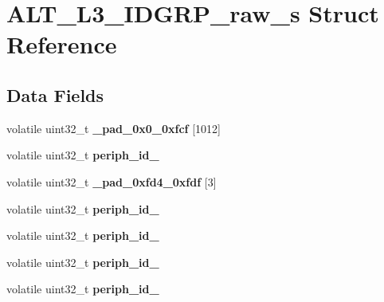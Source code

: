\hypertarget{structALT__L3__IDGRP__raw__s}{}\section{A\+L\+T\+\_\+\+L3\+\_\+\+I\+D\+G\+R\+P\+\_\+raw\+\_\+s Struct Reference}
\label{structALT__L3__IDGRP__raw__s}
\subsection*{Data Fields}
\begin{DoxyCompactItemize}
\item 
\mbox{\label{structALT__L3__IDGRP__raw__s_aa74bcd1eb681706f32f52cc8cdf855bd}} 
volatile uint32\+\_\+t {\bfseries \+\_\+pad\+\_\+0x0\+\_\+0xfcf} \mbox{[}1012\mbox{]}
\item 
\mbox{\label{structALT__L3__IDGRP__raw__s_a82b6fcc76d4a754b701e86f0d8a27f0c}} 
volatile uint32\+\_\+t {\bfseries periph\+\_\+id\+\_}
\item 
\mbox{\label{structALT__L3__IDGRP__raw__s_aa1821355934a592008c6c5e9dcf3fb61}} 
volatile uint32\+\_\+t {\bfseries \+\_\+pad\+\_\+0xfd4\+\_\+0xfdf} \mbox{[}3\mbox{]}
\item 
\mbox{\label{structALT__L3__IDGRP__raw__s_a3b82374c7684f7a2fb10c59d1085b383}} 
volatile uint32\+\_\+t {\bfseries periph\+\_\+id\+\_}
\item 
\mbox{\label{structALT__L3__IDGRP__raw__s_a942ea506104bedb691ac3c0930c6d495}} 
volatile uint32\+\_\+t {\bfseries periph\+\_\+id\+\_}
\item 
\mbox{\label{structALT__L3__IDGRP__raw__s_a3ac749fd0c7a88ad068aa5991ffe0c05}} 
volatile uint32\+\_\+t {\bfseries periph\+\_\+id\+\_}
\item 
\mbox{\label{structALT__L3__IDGRP__raw__s_ab537b5c5187e1b9103e3d6e1e24ceaf6}} 
volatile uint32\+\_\+t {\bfseries periph\+\_\+id\+\_}
\item 
\mbox{\label{structALT__L3__IDGRP__raw__s_a33992da45395d56bc7a3735b64e519e5}} 

\end{DoxyCompactItemize}

